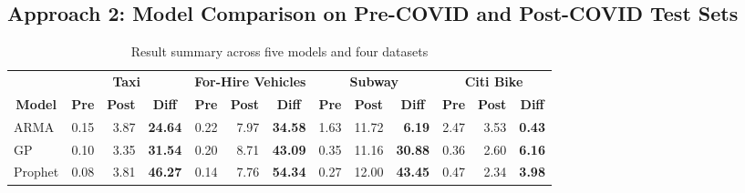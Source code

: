 \documentclass{article}
\begin{document}
\subsection{Approach 2: Model Comparison on Pre-COVID and Post-COVID Test Sets}
\begin{table}[h]
\caption{Result summary across five models and four datasets}
\centering
\begin{adjustbox}{width=\textwidth}
\begin{tabular}{@{}lrrrrrrrrrrrr@{}}
\toprule
\multicolumn{1}{c}{}               & \multicolumn{3}{c}{\textbf{Taxi}}                                                                        & \multicolumn{3}{c}{\textbf{For-Hire Vehicles}}                                                           & \multicolumn{3}{c}{\textbf{Subway}}                                                                      & \multicolumn{3}{c}{\textbf{Citi Bike}}                                                                   \\ \cmidrule(l){2-13} 
\multicolumn{1}{c}{\textbf{Model}} & \multicolumn{1}{c}{\textbf{Pre}} & \multicolumn{1}{c}{\textbf{Post}} & \multicolumn{1}{c}{\textbf{Diff}} & \multicolumn{1}{c}{\textbf{Pre}} & \multicolumn{1}{c}{\textbf{Post}} & \multicolumn{1}{c}{\textbf{Diff}} & \multicolumn{1}{c}{\textbf{Pre}} & \multicolumn{1}{c}{\textbf{Post}} & \multicolumn{1}{c}{\textbf{Diff}} & \multicolumn{1}{c}{\textbf{Pre}} & \multicolumn{1}{c}{\textbf{Post}} & \multicolumn{1}{c}{\textbf{Diff}} \\ \midrule
ARMA                               & 0.15                             & 3.87                              & \textbf{24.64}                    & 0.22                             & 7.97                              & \textbf{34.58}                    & 1.63                             & 11.72                             & \textbf{6.19}                     & 2.47                             & 3.53                              & \textbf{0.43}                     \\
GP                                 & 0.10                             & 3.35                              & \textbf{31.54}                    & 0.20                             & 8.71                              & \textbf{43.09}                    & 0.35                             & 11.16                             & \textbf{30.88}                    & 0.36                             & 2.60                              & \textbf{6.16}                     \\
Prophet                            & 0.08                             & 3.81                              & \textbf{46.27}                    & 0.14                             & 7.76                              & \textbf{54.34}                    & 0.27                             & 12.00                             & \textbf{43.45}                    & 0.47                             & 2.34                              & \textbf{3.98}                     \\

\end{tabular}
\end{adjustbox}
\end{table}
\end{document}
